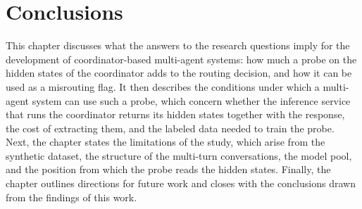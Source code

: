 \chapter{Conclusions}
\label{chap:conclusions}

This chapter discusses what the answers to the research questions imply for the development of coor\-di\-na\-tor-based multi-agent systems: how much a probe on the hidden states of the coordinator adds to the routing decision, and how it can be used as a misrouting flag. It then describes the conditions under which a multi-agent system can use such a probe, which concern whether the inference service that runs the coordinator returns its hidden states together with the response, the cost of extracting them, and the labeled data needed to train the probe. Next, the chapter states the limitations of the study, which arise from the synthetic dataset, the structure of the multi-turn conversations, the model pool, and the position from which the probe reads the hidden states. Finally, the chapter outlines directions for future work and closes with the conclusions drawn from the findings of this work.










